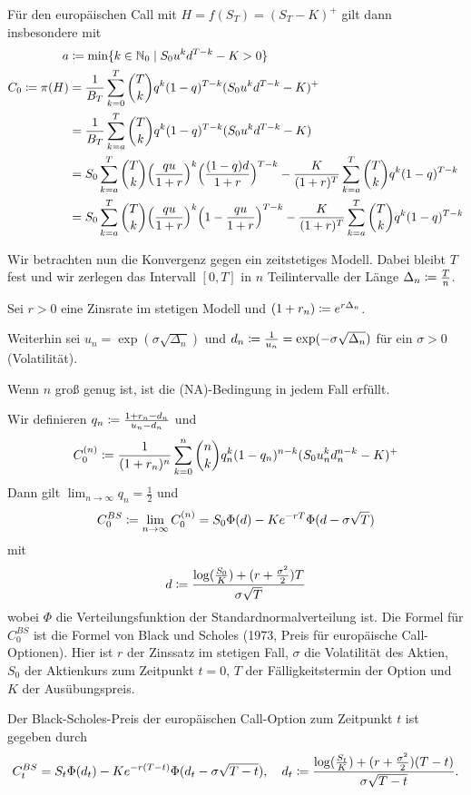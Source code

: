 \documentclass[a4paper,twoside,DIV15,BCOR12mm]{scrbook}
\begin{document}
Für den europäischen Call mit $H=f(S_T)=(S_T-K)^+$ gilt dann insbesondere mit
\begin{align*}
a &\da \min\{ k \in \MdN_0 \mid S_0 u^k d^{T-k} - K > 0 \} \\
C_0 \da \pi(H) &= \frac1{B_T} \sum_{k=0}^T \binom Tk q^k (1-q)^{T-k} (S_0 u^k d^{T-k} - K)^+ \\
&= \frac1{B_T} \sum_{k=a}^T \binom Tk q^k (1-q)^{T-k} (S_0 u^k d^{T-k} - K) \\
&= S_0 \sum_{k=a}^T \binom Tk \Big(\frac{q u}{1+r}\Big)^k \Big(\frac{(1-q)d}{1+r}\Big)^{T-k} - \frac{K}{(1+r)^T} \sum_{k=a}^T \binom Tk q^k (1-q)^{T-k} \\
&= S_0 \sum_{k=a}^T \binom Tk \Big(\frac{q u}{1+r}\Big)^k \Big(1- \frac{	qu}{1+r}\Big)^{T-k} - \frac{K}{(1+r)^T} \sum_{k=a}^T \binom Tk q^k (1-q)^{T-k}
\end{align*}

Wir betrachten nun die Konvergenz gegen ein zeitstetiges Modell. Dabei bleibt $T$ fest und wir zerlegen das Intervall $[0,T]$ in $n$ Teilintervalle der Länge $\Delta_n \da \frac Tn$.

Sei $r>0$ eine Zinsrate im stetigen Modell und $(1+r_n)\da e^{r\Delta_n}$.

Weiterhin sei  $u_n = \exp(\sigma \sqrt{\Delta_n})$ und $d_n \da \frac{1}{u_n} = \exp(-\sigma \sqrt{\Delta_n})$ für ein $\sigma>0$ (Volatilität).

Wenn $n$ groß genug ist, ist die (NA)-Bedingung in jedem Fall erfüllt.

Wir definieren $q_n\da \frac{1 + r_n - d_n}{u_n-d_n}$ und 
\[
C_0^{(n)} \da \frac 1{(1+r_n)^n} \sum_{k=0}^n \binom n k q_n^k(1-q_n)^{n-k} (S_0 u_n^k d_n^{n-k} - K)^+
\]
Dann gilt $\lim_{n\to\infty} q_n= \frac 12$ und
\[
C_0^{BS} \da \lim_{n\to\infty} C_0^{(n)} = S_0 \Phi(d) - Ke^{-rT}\Phi(d-\sigma\sqrt{T})
\]
mit
\[
d \da \frac{\log(\frac{S_0}K) + (r + \frac{\sigma^2}{2})T}{\sigma \sqrt{T}}
\]
wobei $\Phi$ die Verteilungsfunktion der Standardnormalverteilung ist. Die Formel für $C_0^{BS}$ ist die Formel von Black und Scholes (1973, Preis für europäische Call-Optionen). Hier ist $r$ der Zinssatz im stetigen Fall, $\sigma$ die Volatilität des Aktien, $S_0$ der Aktienkurs zum Zeitpunkt $t=0$, $T$ der Fälligkeitstermin der Option und $K$ der Ausübungspreis.

Der Black-Scholes-Preis der europäischen Call-Option zum Zeitpunkt $t$ ist gegeben durch
\[
C_t^{BS} = S_t\Phi(d_t) - Ke^{-r(T-t)}\Phi(d_t - \sigma\sqrt{T-t}),\quad d_t \da \frac{\log(\frac{S_t}K) + (r + \frac{\sigma^2}{2})(T-t)}{\sigma \sqrt{T-t}}.
\] 
\end{document}
